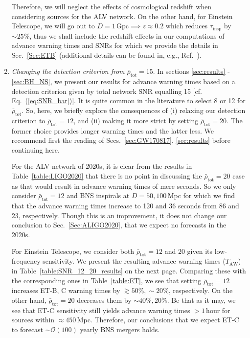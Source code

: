 \documentclass[prd,amsmath,amssymb,aps,floats,amsfonts,notitlepage,superscriptaddress,eqsecnum,nofootinbib,10pt]{revtex4-1}
\newcommand{\ord}{\mathcal{O}}
\begin{document}
\begin{enumerate}
Therefore, we will neglect the effects of cosmological redshift 
when considering sources for the ALV network.
On the other hand, for Einstein Telescope, we will go out to $D=1\,\text{Gpc}\implies z\approx 0.2$
which reduces $\tau_\text{insp}$ by $\sim 25\%$, thus we shall include the redshift effects in our computations of advance warning times and SNRs
for which we provide the details in Sec.~\ref{Sec:ETB} (additional details can be found in, e.g., Ref.~\cite{Phinney:2001di}). 
%
\item {\it Changing the detection criterion from} $\bar{\rho}_\text{tot}=15$. 
In sections \ref{sec:results} - \ref{sec:BH_NS}, we present our results for advance warning times based on a detection criterion
given by total network SNR equalling 15 [cf. Eq.~(\ref{eq:SNR_bar})].
It is quite common in the literature to select 8 or 12 for $ \bar\rho_\text{tot} $.
So, here, we briefly explore the consequences of (i) relaxing our detection criterion to $\bar{\rho}_\text{tot}=12$, and (ii) making it more strict by setting $\bar{\rho}_\text{tot}=20$.
The former choice provides longer warning times and the latter less.
We recommend first the reading of Secs.~\ref{sec:GW170817}, \ref{sec:results} before continuing here.

For the ALV network of 2020s, it is clear from the results in Table~\ref{table:LIGO2020} that
there is no point in discussing the $\bar{\rho}_\text{tot}=20$ case as that would result in advance
warning times of mere seconds. So we only consider $\bar{\rho}_\text{tot}=12$ and BNS inspirals at $D=50,100\,$Mpc for which we find that the advance warning times increase to 120 and 36 seconds from 86 and 23, respectively. Though this is an improvement, it does not change our conclusion to Sec.~\ref{Sec:ALIGO2020}, that we expect no forecasts in the 2020s.

For Einstein Telescope, we consider both $\bar{\rho}_\text{tot}=12$ and 20 given its low-frequency sensitivity. We present the resulting advance warning times ($T_\text{AW}$) in Table~\ref{table:SNR_12_20_results}
on the next page. Comparing these with the corresponding ones in Table~\ref{table:ET}, we see that setting
$\bar{\rho}_\text{tot}=12$ increases ET-B, C warning times by $\gtrsim 50\%, \sim 20\%$, respectively.
On the other hand, $\bar{\rho}_\text{tot}=20$ decreases them by $\sim 40\%, 20\%$.
Be that as it may, we see that ET-C sensitivity still yields advance warning times $> 1\,$hour for sources within $\approx 450$\,Mpc. Therefore, our conclusions that we expect ET-C to forecast $\sim \ord(100)$ yearly
BNS mergers holds.


\end{enumerate}
\end{document}
